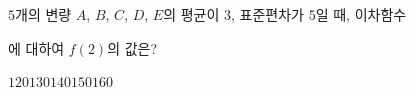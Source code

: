 $5$개의 변량 $A$, $B$, $C$, $D$, $E$의 평균이 $3$, 표준편차가 $5$일 때, 이차함수\par{}\par\noindent 에 대하여 $f(2)$의 값은?
\begin{choices32}{$120$}{$130$}{$140$}{$150$}{$160$}\end{choices32}
